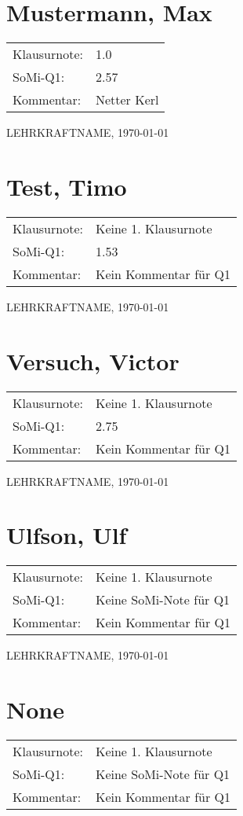 \documentclass[a6paper,10pt]{scrartcl}
\begin{document}
\section*{Mustermann, Max} \begin{tabularx}{\textwidth}{lX}
 Klausurnote: &1.0\\
 SoMi-Q1: &2.57\\
 Kommentar: &Netter Kerl\end{tabularx}

 \vfill LEHRKRAFTNAME, \today
 \clearpage
 
 
\section*{Test, Timo} \begin{tabularx}{\textwidth}{lX}
 Klausurnote: &Keine 1. Klausurnote\\
 SoMi-Q1: &1.53\\
 Kommentar: &Kein Kommentar für Q1\end{tabularx}

 \vfill LEHRKRAFTNAME, \today
 \clearpage
 
 
\section*{Versuch, Victor} \begin{tabularx}{\textwidth}{lX}
 Klausurnote: &Keine 1. Klausurnote\\
 SoMi-Q1: &2.75\\
 Kommentar: &Kein Kommentar für Q1\end{tabularx}

 \vfill LEHRKRAFTNAME, \today
 \clearpage
 
 
\section*{Ulfson, Ulf} \begin{tabularx}{\textwidth}{lX}
 Klausurnote: &Keine 1. Klausurnote\\
 SoMi-Q1: &Keine SoMi-Note für Q1\\
 Kommentar: &Kein Kommentar für Q1\end{tabularx}

 \vfill LEHRKRAFTNAME, \today
 \clearpage
 
 
\section*{None} \begin{tabularx}{\textwidth}{lX}
 Klausurnote: &Keine 1. Klausurnote\\
 SoMi-Q1: &Keine SoMi-Note für Q1\\
 Kommentar: &Kein Kommentar für Q1\end{tabularx}
\end{document}
